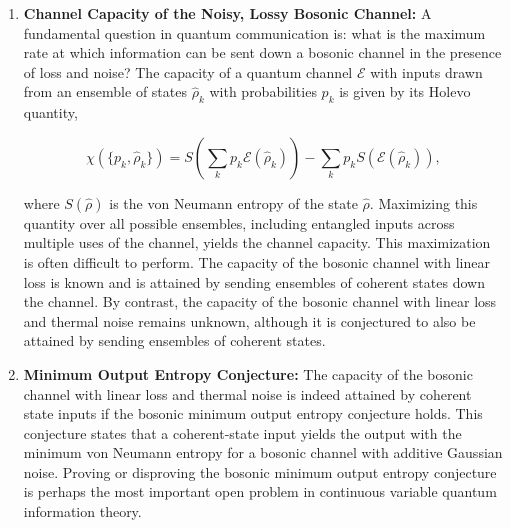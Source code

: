 \begin{enumerate}
    \item \textbf{Channel Capacity of the Noisy, Lossy Bosonic Channel:} A fundamental question in quantum communication is: what is the maximum rate at which information can be sent down a bosonic channel in the presence of loss and noise? The capacity of a quantum channel $\mathcal{E}$ with inputs drawn from an ensemble of states $\hat{\rho}_k$ with probabilities $p_k$ is given by its Holevo quantity,

\begin{equation}
    \chi(\{p_k, \hat{\rho}_k\}) = S\left(\sum_k p_k \mathcal{E}(\hat{\rho}_k)\right) - \sum_k p_k S\left(\mathcal{E}(\hat{\rho}_k)\right),
\end{equation}

where $S(\hat{\rho})$ is the von Neumann entropy of the state $\hat{\rho}$. Maximizing this quantity over all possible ensembles, including entangled inputs across multiple uses of the channel, yields the channel capacity. This maximization is often difficult to perform. The capacity of the bosonic channel with linear loss is known and is attained by sending ensembles of coherent states down the channel. By contrast, the capacity of the bosonic channel with linear loss and thermal noise remains unknown, although it is conjectured to also be attained by sending ensembles of coherent states.

    \item \textbf{Minimum Output Entropy Conjecture:} The capacity of the bosonic channel with linear loss and thermal noise is indeed attained by coherent state inputs if the bosonic minimum output entropy conjecture holds. This conjecture states that a coherent-state input yields the output with the minimum von Neumann entropy for a bosonic channel with additive Gaussian noise. Proving or disproving the bosonic minimum output entropy conjecture is perhaps the most important open problem in continuous variable quantum information theory.


\end{enumerate}

